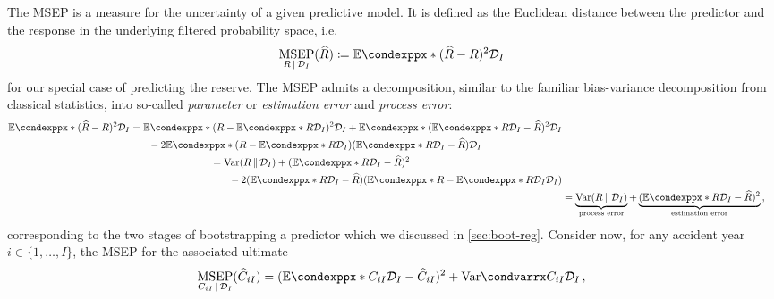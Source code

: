 \documentclass[a4paper]{book}
\begin{document}
The MSEP is a measure for the uncertainty of a given predictive model. It is defined as the Euclidean distance between the predictor and the response in the underlying filtered probability space, i.e.\
\begin{equation}
  \underset{R \, \vert \, \mathcal{D}_I}{\mathrm{MSEP}}(\widehat{R}) \coloneqq \condexpp*{(\widehat{R} - R)^2}{\mathcal{D}_I}
\end{equation}
for our special case of predicting the reserve. The MSEP admits a decomposition, similar to the familiar bias-variance decomposition from classical statistics, into so-called \emph{parameter} or \emph{estimation error} and \emph{process error}:
\begin{align}
  \begin{split}
    \condexpp*{(\widehat{R} - R)^2}{\mathcal{D}_I} &= \condexpp*{(R - \condexpp*{R}{\mathcal{D}_I})^2}{\mathcal{D}_I} + \condexpp*{(\condexpp*{R}{\mathcal{D}_I} - \widehat{R})^2}{\mathcal{D}_I} \\ &\phantom{{}=1} -2\condexpp*{(R - \condexpp*{R}{\mathcal{D}_I})(\condexpp*{R}{\mathcal{D}_I} - \widehat{R})}{\mathcal{D}_I}
  \end{split} \\
  \begin{split}
    &= \mathrm{Var}(R \, \Vert \, \mathcal{D}_I) + (\condexpp*{R}{\mathcal{D}_I} - \widehat{R})^2 \\
    &\phantom{{}=1} -2(\condexpp*{R}{\mathcal{D}_I} - \widehat{R})(\condexpp*{R - \condexpp*{R}{\mathcal{D}_I}}{\mathcal{D}_I})
  \end{split}                                                                                                                                                                                                                                               \\
   & = \underbrace{\mathrm{Var}(R \, \Vert \, \mathcal{D}_I)}_\text{process error} + \underbrace{(\condexpp*{R}{\mathcal{D}_I} - \widehat{R})^2}_\text{estimation error} \,,
\end{align}
corresponding to the two stages of bootstrapping a predictor which we discussed in \cref{sec:boot-reg}. Consider now, for any accident year $i \in \{ 1, \dots, I \}$, the MSEP for the associated ultimate
\begin{equation} \label{eq:msep}
  \underset{C_{iI} \, \vert \, \mathcal{D}_I}{\mathrm{MSEP}}(\widehat{C}_{iI}) = (\condexpp*{C_{iI}}{\mathcal{D}_I} - \widehat{C}_{iI})^2 + \condvarr{C_{iI}}{\mathcal{D}_I} \,,
\end{equation}
\end{document}
